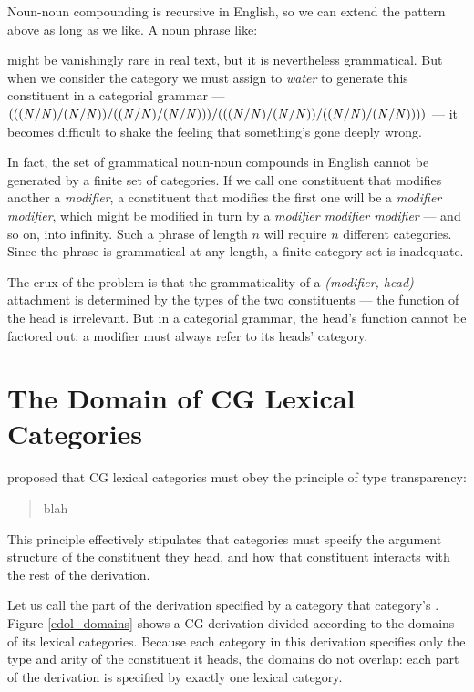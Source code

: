\documentclass{article}
\newcommand{\cf}[1]{\mbox{$\it{#1}$}}   %
\newcommand{\cg}{CG\xspace}
\begin{document}
Noun-noun compounding is recursive in English, so we can extend the pattern above as long as we like. A noun phrase like:


might be vanishingly rare in real text, but it is nevertheless grammatical. But when we consider the category we must assign to \emph{water} to generate this constituent in a categorial grammar --- \cf{(((N/N)/(N/N))/((N/N)/(N/N)))/(((N/N)/(N/N))/((N/N)/(N/N))))} --- it becomes difficult to shake the feeling that something's gone deeply wrong.

In fact, the set of grammatical noun-noun compounds in English cannot be generated by a finite set of categories. If we call one constituent that modifies another a \emph{modifier}, a constituent that modifies the first one will be a \emph{modifier modifier}, which might be modified in turn by a \emph{modifier modifier modifier} --- and so on, into infinity. Such a phrase of length $n$ will require $n$ different categories. Since the phrase is grammatical at any length, a finite category set is inadequate.

The crux of the problem is that the grammaticality of a \emph{(modifier, head)} attachment is determined by the types of the two constituents --- the function of the head is irrelevant. But in a categorial grammar, the head's function cannot be factored out: a modifier must always refer to its heads' category.

\section{The Domain of \cg Lexical Categories}

\citet{steedman96} proposed that \cg lexical categories must obey the principle of type transparency:

\begin{quote}
blah
\end{quote}

This principle effectively stipulates that categories must specify the argument structure of the constituent they head, and how that constituent interacts with the rest of the derivation.

Let us call the part of the derivation specified by a category that category's . Figure \ref{edol_domains} shows a \cg derivation divided according to the domains of its lexical categories. Because each category in this derivation specifies only the type and arity of the constituent it heads, the domains do not overlap: each part of the derivation is specified by exactly one lexical category.
\end{document}

